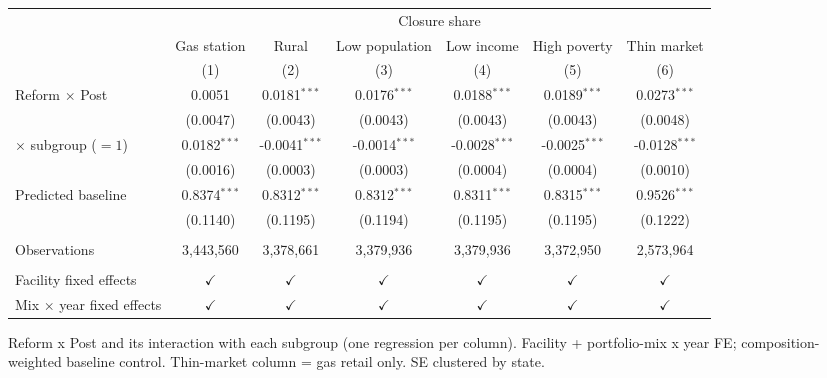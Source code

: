 
\begingroup
\centering
\begin{tabular}{lcccccc}
   \toprule
    & \multicolumn{6}{c}{Closure share}\\
                                    & Gas station    & Rural           & Low population  & Low income      & High poverty    & Thin market \\   
                                    & (1)            & (2)             & (3)             & (4)             & (5)             & (6)\\  
   \midrule 
   Reform $\times$ Post             & 0.0051         & 0.0181$^{***}$  & 0.0176$^{***}$  & 0.0188$^{***}$  & 0.0189$^{***}$  & 0.0273$^{***}$\\   
                                    & (0.0047)       & (0.0043)        & (0.0043)        & (0.0043)        & (0.0043)        & (0.0048)\\   
   \quad $\times$ subgroup ($=1$)   & 0.0182$^{***}$ & -0.0041$^{***}$ & -0.0014$^{***}$ & -0.0028$^{***}$ & -0.0025$^{***}$ & -0.0128$^{***}$\\   
                                    & (0.0016)       & (0.0003)        & (0.0003)        & (0.0004)        & (0.0004)        & (0.0010)\\   
   Predicted baseline               & 0.8374$^{***}$ & 0.8312$^{***}$  & 0.8312$^{***}$  & 0.8311$^{***}$  & 0.8315$^{***}$  & 0.9526$^{***}$\\   
                                    & (0.1140)       & (0.1195)        & (0.1194)        & (0.1195)        & (0.1195)        & (0.1222)\\   
    \\
   Observations                     & 3,443,560      & 3,378,661       & 3,379,936       & 3,379,936       & 3,372,950       & 2,573,964\\  
    \\
   Facility fixed effects           & $\checkmark$   & $\checkmark$    & $\checkmark$    & $\checkmark$    & $\checkmark$    & $\checkmark$\\   
   Mix $\times$ year fixed effects  & $\checkmark$   & $\checkmark$    & $\checkmark$    & $\checkmark$    & $\checkmark$    & $\checkmark$\\   
   \bottomrule
\end{tabular}
 
\par \raggedright 
Reform x Post and its interaction with each subgroup (one regression per column). Facility + portfolio-mix x year FE; composition-weighted baseline control. Thin-market column = gas retail only. SE clustered by state.
\par\endgroup


